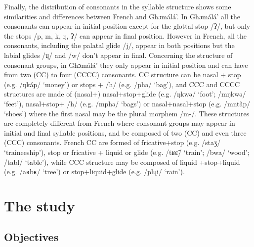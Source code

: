 \documentclass[output=paper,newtxmath,modfonts,nonflat,draftmode]{langsci/langscibook}
\begin{document}
Finally, the distribution of consonants in the syllable structure shows some similarities and differences between French and Ghɔmálá’. In Ghɔmálá’ all the consonants can appear in initial position except for the glottal stop /ʔ/, but only the stops /p, m, k, ŋ, ʔ/ can appear in final position. However in French, all the consonants, including the palatal glide /j/, appear in both positions but the labial glides /ɥ/ and /w/ don’t appear in final. Concerning the structure of consonant groups, in Ghɔmálá’ they only appear in initial position and can have from two (CC) to four (CCCC) consonants. CC structure can be nasal + stop (e.g. /ŋkáp/ `money') or stops + /h/ (e.g. /phə/ `bag'), and CCC and CCCC structures are made of (nasal+) nasal+stop+glide (e.g. /ŋkwə/ `foot'; /mŋkwə/ `feet'), nasal+stop+ /h/ (e.g. /mphə/ `bags') or nasal+nasal+stop (e.g. /mntǎp/ `shoes') where the first nasal may be the plural morphem /m-/. These structures are completely different from French where consonant groups may appear in initial and final syllable positions, and be composed of two (CC) and even three (CCC) consonants. French CC are formed of fricative+stop (e.g. /staʒ/ `traineeship'), stop or fricative + liquid or glide (e.g. /tʁɛ̃/ `train'; /bwa/ `wood'; /tabl/ `table'), while CCC structure may be composed of liquid +stop+liquid (e.g. /aʁbʁ/ `tree') or stop+liquid+glide (e.g. /plɥi/ `rain').

\section{The study} %
\subsection{Objectives} %
\end{document}
